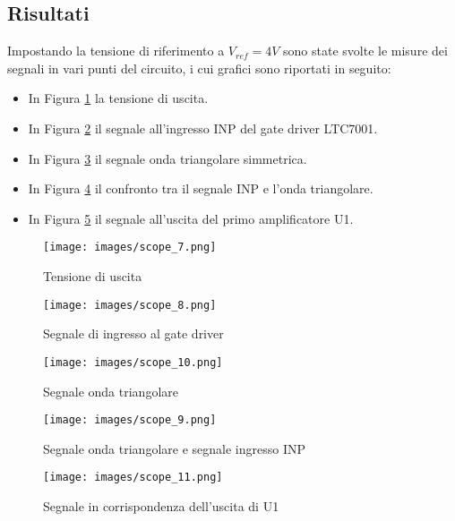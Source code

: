 \subsection{Risultati}
Impostando la tensione di riferimento a $V_{ref}=4V$ sono state svolte le misure dei segnali in vari punti del circuito,  i cui grafici sono riportati in seguito:
\begin{itemize}
    \item In Figura \ref{fig:OutVoltage2} la tensione di uscita.
    \item In Figura \ref{fig:GateDriverINP} il segnale all'ingresso INP del gate driver LTC7001.
    \item In Figura \ref{fig:SawtoothSignal} il segnale onda triangolare simmetrica. 
    \item In Figura \ref{fig:CompareSawtoothINP} il confronto tra il segnale INP e l'onda triangolare.
    \item In Figura \ref{fig:U1Output} il segnale all'uscita del primo amplificatore U1.
\end{itemize}
\begin{figure}[H]
    \centering
    \texttt{[image: images/scope\_7.png]}
    \caption{Tensione di uscita}
    \label{fig:OutVoltage2}
\end{figure}
\begin{figure}[H]
    \centering
    \texttt{[image: images/scope\_8.png]}
    \caption{Segnale di ingresso al gate driver}
    \label{fig:GateDriverINP}
\end{figure}
\begin{figure}[H]
    \centering
    \texttt{[image: images/scope\_10.png]}
    \caption{Segnale onda triangolare}
    \label{fig:SawtoothSignal}
\end{figure}
\begin{figure}[H]
    \centering
    \texttt{[image: images/scope\_9.png]}
    \caption{Segnale onda triangolare e segnale ingresso INP}
    \label{fig:CompareSawtoothINP}
\end{figure}
\begin{figure}[H]
    \centering
    \texttt{[image: images/scope\_11.png]}
    \caption{Segnale in corrispondenza dell'uscita di U1}
    \label{fig:U1Output}
\end{figure}
\clearpage
